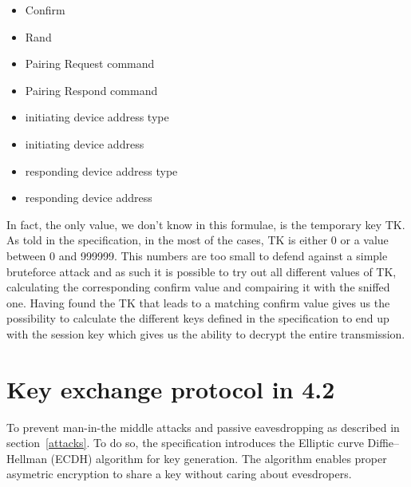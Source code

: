 \documentclass[conference]{IEEEtran}
\begin{document}
\begin{itemize}
  \item Confirm
  \item Rand
  \item Pairing Request command
  \item Pairing Respond command
  \item initiating device address type
  \item initiating device address
  \item responding device address type
  \item responding device address
\end{itemize}

In fact, the only value, we don't know in this formulae, is the temporary key TK. As told in the specification, in the most of the cases, TK is either 0 or a value between 0 and 999999. This numbers are too small to defend against a simple bruteforce attack and as such it is possible to try out all different values of TK, calculating the corresponding confirm value and compairing it with the sniffed one. Having found the TK that leads to a matching confirm value gives us the possibility to calculate the different keys defined in the specification to end up with the session key which gives us the ability to decrypt the entire transmission.

\section{Key exchange protocol in 4.2}

To prevent man-in-the middle attacks and passive eavesdropping as described in section~\ref{attacks}. To do so, the specification introduces the Elliptic curve Diffie–Hellman (ECDH) algorithm for key generation. The algorithm enables proper asymetric encryption to share a key without caring about evesdropers.



%
%
\end{document}
